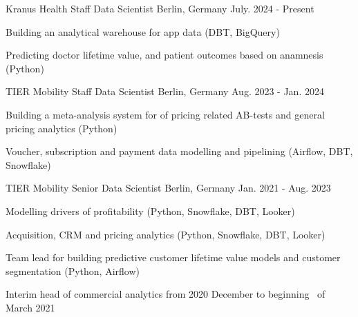 
\begin{cventries}


  \cventry
    {Kranus Health} %
    {Staff Data Scientist} %
    {Berlin, Germany} %
    {July. 2024 - Present} %
    {
      \begin{cvitems}
        \item {Building an analytical warehouse for app data (DBT, BigQuery)}
        \item {Predicting doctor lifetime value, and patient outcomes based on anamnesis (Python)}
      \end{cvitems}
    }

  \cventry
    {TIER Mobility} %
    {Staff Data Scientist} %
    {Berlin, Germany} %
    {Aug. 2023 - Jan. 2024} %
    {
      \begin{cvitems}
        \item {Building a meta-analysis system for of pricing related AB-tests and general pricing analytics (Python)}
        \item {Voucher, subscription and payment data modelling and pipelining (Airflow, DBT, Snowflake)}
      \end{cvitems}
    }

  \cventry
    {TIER Mobility} %
    {Senior Data Scientist} %
    {Berlin, Germany} %
    {Jan. 2021 - Aug. 2023} %
    {
      \begin{cvitems}
        \item {Modelling drivers of profitability (Python, Snowflake, DBT, Looker)}
        \item {Acquisition, CRM and pricing analytics (Python, Snowflake, DBT, Looker)}
        \item {Team lead for building predictive customer lifetime
        value models and customer segmentation (Python, Airflow)}
        \item {Interim head of commercial analytics from 2020 December to beginning \
        of March 2021}
      \end{cvitems}
    }


\end{cventries}
